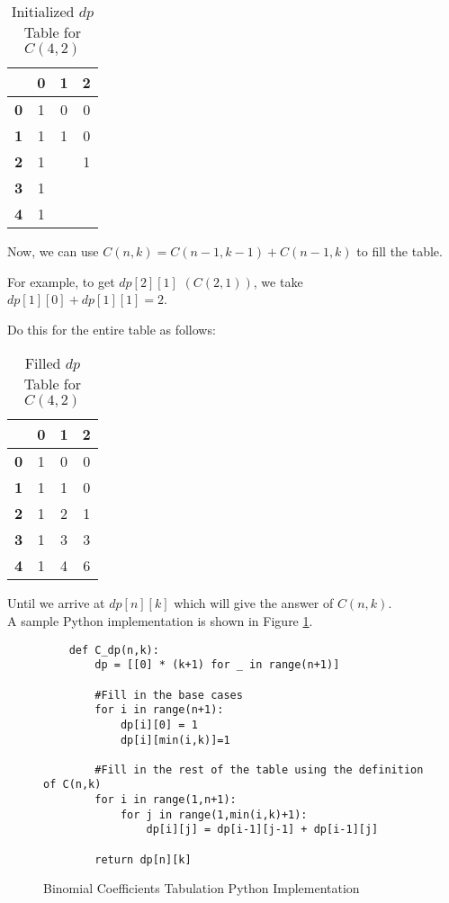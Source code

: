 \begin{table}[H]
    \centering
    \begin{tabular}{|c|c|c|c|}
        \hline
          & \textbf{0} & \textbf{1} & \textbf{2} \\
        \hline
        \textbf{0} & 1 & 0 & 0 \\
        \hline
        \textbf{1} & 1 & 1 & 0 \\
        \hline
        \textbf{2} & 1 &   & 1 \\
        \hline
        \textbf{3} & 1 &   &  \\
        \hline
        \textbf{4} & 1 &   &   \\
        \hline
    \end{tabular}
    \caption{Initialized $dp$ Table for $C(4,2)$}
\end{table}
Now, we can use $C(n,k) = C(n-1,k-1) + C(n-1,k)$ to fill the table.

For example, to get $dp[2][1]$ $(C(2,1))$, we take $dp[1][0] + dp[1][1] = 2$.

Do this for the entire table as follows:

\begin{table}[H]
    \centering
    \begin{tabular}{|c|c|c|c|}
        \hline
          & \textbf{0} & \textbf{1} & \textbf{2} \\
        \hline
        \textbf{0} & 1 & 0 & 0 \\
        \hline
        \textbf{1} & 1 & 1 & 0 \\
        \hline
        \textbf{2} & 1 & 2 & 1 \\
        \hline
        \textbf{3} & 1 & 3 & 3 \\
        \hline
        \textbf{4} & 1 & 4 & 6 \\
        \hline
    \end{tabular}
    \caption{Filled $dp$ Table for $C(4,2)$}
\end{table}

Until we arrive at $dp[n][k]$ which will give the answer of $C(n,k)$.\\

A sample Python implementation is shown in Figure \ref{fig:binomial-dp}.

\begin{figure}[H]
    \centering
    \begin{lstlisting}
    def C_dp(n,k):
        dp = [[0] * (k+1) for _ in range(n+1)]
    
        #Fill in the base cases
        for i in range(n+1):
            dp[i][0] = 1
            dp[i][min(i,k)]=1
    
        #Fill in the rest of the table using the definition of C(n,k)
        for i in range(1,n+1):
            for j in range(1,min(i,k)+1):
                dp[i][j] = dp[i-1][j-1] + dp[i-1][j]
                
        return dp[n][k]
    \end{lstlisting}
    \caption{Binomial Coefficients Tabulation Python Implementation}
    \label{fig:binomial-dp}
\end{figure}

